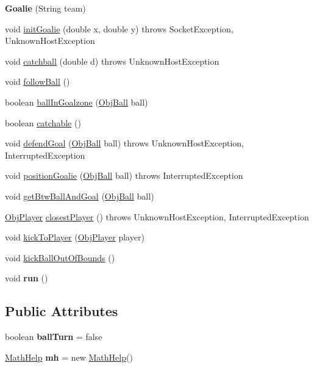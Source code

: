 \begin{DoxyCompactItemize}
\item 
\hypertarget{classGoalie_a61f0e1513d23a5bfd8b06b4f64485f14}{
{\bfseries Goalie} (String team)}
\label{classGoalie_a61f0e1513d23a5bfd8b06b4f64485f14}

\item 
void \hyperlink{classGoalie_ad20be55693ae031a73e703960ae96db3}{initGoalie} (double x, double y)  throws SocketException, UnknownHostException 
\item 
void \hyperlink{classGoalie_aa31abfeafaa76d73433c75661e9ee214}{catchball} (double d)  throws UnknownHostException
\item 
void \hyperlink{classGoalie_a6fa9af8f62836e180e56a51f9bc126dc}{followBall} ()
\item 
boolean \hyperlink{classGoalie_aeedb27a3d7123889aa35b122cd9f8e6a}{ballInGoalzone} (\hyperlink{classObjBall}{ObjBall} ball)
\item 
boolean \hyperlink{classGoalie_aff96bcc0763bcb7ca922beae5f6f7f6f}{catchable} ()
\item 
void \hyperlink{classGoalie_a3d00b5dcb6db3925a8eeaf667a2f1650}{defendGoal} (\hyperlink{classObjBall}{ObjBall} ball)  throws UnknownHostException, InterruptedException 
\item 
void \hyperlink{classGoalie_a6b24e53882b2d38ca452c263eb9c58cd}{positionGoalie} (\hyperlink{classObjBall}{ObjBall} ball)  throws InterruptedException 
\item 
void \hyperlink{classGoalie_aacefd54603f62188922344f027a60b65}{getBtwBallAndGoal} (\hyperlink{classObjBall}{ObjBall} ball)
\item 
\hyperlink{classObjPlayer}{ObjPlayer} \hyperlink{classGoalie_a1377353efede128a3367bde1e8b4137a}{closestPlayer} ()  throws UnknownHostException, InterruptedException 
\item 
void \hyperlink{classGoalie_acef3607fe805cab95fe5c51319b6d858}{kickToPlayer} (\hyperlink{classObjPlayer}{ObjPlayer} player)
\item 
void \hyperlink{classGoalie_a4fc1cb6aef2b752d6eaf198b33355ba3}{kickBallOutOfBounds} ()
\item 
\hypertarget{classGoalie_a4746e13da625b6794aab143d8c3bf12f}{
void {\bfseries run} ()}
\label{classGoalie_a4746e13da625b6794aab143d8c3bf12f}

\end{DoxyCompactItemize}
\subsection*{Public Attributes}
\begin{DoxyCompactItemize}
\item 
\hypertarget{classGoalie_a30191095e1d0cfb3309d7776d2f1b91d}{
boolean {\bfseries ballTurn} = false}
\label{classGoalie_a30191095e1d0cfb3309d7776d2f1b91d}

\item 
\hypertarget{classGoalie_aa14c124f0012e6bf819efaa138597dbb}{
\hyperlink{classMathHelp}{MathHelp} {\bfseries mh} = new \hyperlink{classMathHelp}{MathHelp}()}
\label{classGoalie_aa14c124f0012e6bf819efaa138597dbb}

\end{DoxyCompactItemize}
